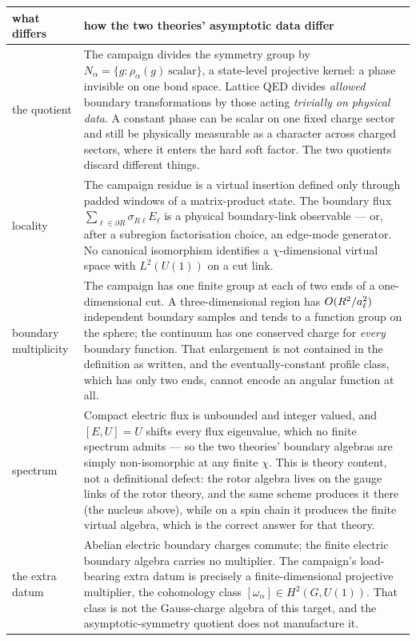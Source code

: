 \begin{center}
\begin{tabular}{@{}p{}p{}@{}}
\toprule
\textbf{what differs} & \textbf{how the two theories' asymptotic data differ} \\
\midrule
the quotient &
The campaign divides the symmetry group by
$N_\alpha=\{g:\rho_\alpha(g)\ \text{scalar}\}$, a state-level projective
kernel: a phase invisible on one bond space. Lattice QED divides
\emph{allowed} boundary transformations by those acting \emph{trivially on
physical data}. A constant phase can be scalar on one fixed charge sector and
still be physically measurable as a character across charged sectors, where it
enters the hard soft factor. The two quotients discard different things. \\
\midrule
locality &
The campaign residue is a virtual insertion defined only through padded windows
of a matrix-product state. The boundary flux
$\sum_{\ell\in\partial R}\sigma_{R\ell}E_\ell$ is a physical boundary-link
observable --- or, after a subregion factorisation choice, an edge-mode
generator. No canonical isomorphism identifies a $\chi$-dimensional virtual
space with $L^2(U(1))$ on a cut link. \\
\midrule
boundary multiplicity &
The campaign has one finite group at each of two ends of a one-dimensional cut.
A three-dimensional region has $O(R^2/a_{\ell}^2)$ independent boundary
samples and tends to a function group on the sphere; the continuum has one
conserved charge for \emph{every} boundary function. That enlargement is not
contained in the definition as written, and the eventually-constant profile
class, which has only two ends, cannot encode an angular function at all. \\
\midrule
spectrum &
Compact electric flux is unbounded and integer valued, and $[E,U]=U$ shifts
every flux eigenvalue, which no finite spectrum admits --- so the two
theories' boundary algebras are simply non-isomorphic at any finite $\chi$.
This is theory content, not a definitional defect: the rotor algebra lives on
the gauge links of the rotor theory, and the same scheme produces it there
(the nucleus above), while on a spin chain it produces the finite virtual
algebra, which is the correct answer for that theory. \\
\midrule
the extra datum &
Abelian electric boundary charges commute; the finite electric boundary algebra
carries no multiplier. The campaign's load-bearing extra datum is precisely a
finite-dimensional projective multiplier, the cohomology class
$[\omega_\alpha]\in H^2(G,U(1))$. That class is not the Gauss-charge algebra of
this target, and the asymptotic-symmetry quotient does not manufacture it. \\
\bottomrule
\end{tabular}
\end{center}


